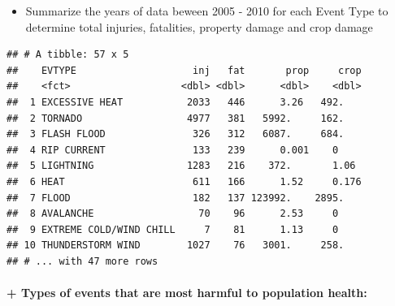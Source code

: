 \documentclass[]{article}
\newenvironment{Shaded}{\begin{snugshade}}{\end{snugshade}}
\newcommand{\DataTypeTok}[1]{\textcolor[rgb]{0.13,0.29,0.53}{#1}}
\newcommand{\KeywordTok}[1]{\textcolor[rgb]{0.13,0.29,0.53}{\textbf{#1}}}
\newcommand{\NormalTok}[1]{#1}
\newcommand{\OperatorTok}[1]{\textcolor[rgb]{0.81,0.36,0.00}{\textbf{#1}}}
\newcommand{\StringTok}[1]{\textcolor[rgb]{0.31,0.60,0.02}{#1}}
\providecommand{\tightlist}{%
  \setlength{\itemsep}{0pt}\setlength{\parskip}{0pt}}
\let\oldparagraph\paragraph
\renewcommand{\paragraph}[1]{\oldparagraph{#1}\mbox{}}
\begin{document}
\begin{itemize}
\tightlist
\item
  Summarize the years of data beween 2005 - 2010 for each Event Type to
  determine total injuries, fatalities, property damage and crop damage
\end{itemize}

\begin{Shaded}
\end{Shaded}

\begin{verbatim}
## # A tibble: 57 x 5
##    EVTYPE                    inj   fat       prop     crop
##    <fct>                   <dbl> <dbl>      <dbl>    <dbl>
##  1 EXCESSIVE HEAT           2033   446      3.26   492.   
##  2 TORNADO                  4977   381   5992.     162.   
##  3 FLASH FLOOD               326   312   6087.     684.   
##  4 RIP CURRENT               133   239      0.001    0    
##  5 LIGHTNING                1283   216    372.       1.06 
##  6 HEAT                      611   166      1.52     0.176
##  7 FLOOD                     182   137 123992.    2895.   
##  8 AVALANCHE                  70    96      2.53     0    
##  9 EXTREME COLD/WIND CHILL     7    81      1.13     0    
## 10 THUNDERSTORM WIND        1027    76   3001.     258.   
## # ... with 47 more rows
\end{verbatim}

\hypertarget{types-of-events-that-are-most-harmful-to-population-health}{%
\paragraph{+ Types of events that are most harmful to population
health:}\label{types-of-events-that-are-most-harmful-to-population-health}}
\end{document}
